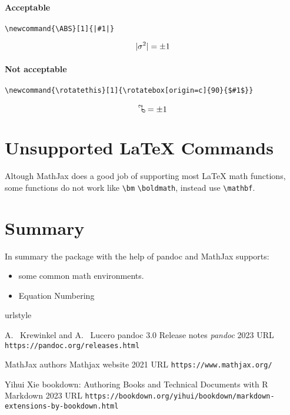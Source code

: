 \paragraph{Acceptable}

\begin{verbatim}
\newcommand{\ABS}[1]{|#1|}
\end{verbatim}

$$ \ABS{\sigma^2} = \pm 1 $$

\paragraph{Not acceptable}


\begin{verbatim}
\newcommand{\rotatethis}[1]{\rotatebox[origin=c]{90}{$#1$}}
\end{verbatim}

$$ \rotatethis{\sigma^2} = \pm 1 $$


\section{Unsupported LaTeX Commands}

Altough MathJax does a good job of supporting most LaTeX math functions,
some functions do not work like \verb|\bm| \verb|\boldmath|, instead use \verb|\mathbf|.





\section{Summary}

In summary the  package with the help of pandoc and MathJax supports:
\begin{itemize}
\item some common math environments.
\item Equation Numbering
\end{itemize}


\begin{thebibliography}{2}
    \providecommand{\natexlab}[1]{#1}
    \providecommand{\url}[1]{\texttt{#1}}
    \expandafter\ifx\csname urlstyle\endcsname\relax
      \providecommand{\doi}[1]{doi: #1}\else
      \providecommand{\doi}{doi: \begingroup \urlstyle{rm}\Url}\fi

A.~ Krewinkel and A.~ Lucero
\newblock pandoc 3.0 Release notes
\newblock \emph{pandoc}  2023
\newblock URL \url{https://pandoc.org/releases.html}

MathJax authors
\newblock Mathjax website
\newblock  {} 2021
\newblock URL \url{https://www.mathjax.org/}

Yihui Xie
\newblock bookdown: Authoring Books and Technical Documents with R Markdown
\newblock {} 2023
\newblock URL \url{https://bookdown.org/yihui/bookdown/markdown-extensions-by-bookdown.html}

\end{thebibliography}


\address{%
Abhishek Ulayil\\
Student, Institute of Actuaries of India\\%
Mumbai, India\\
ORCiD: 0009-0000-6935-8690\\
}

